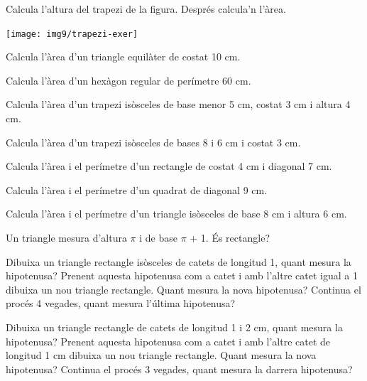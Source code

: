 \begin{activitats}
\begin{mylist}
\exer \hot Calcula l'altura del trapezi de la figura. Després calcula'n l'àrea.

\begin{center}
	\texttt{[image: img9/trapezi-exer]}
\end{center}

\exer  Calcula l'àrea d'un triangle equilàter de costat 10 cm.

\exer  Calcula l'àrea d'un hexàgon regular de perímetre 60 cm.

\exer  Calcula l'àrea d'un trapezi isòsceles de base menor 5 cm, costat 3 cm i altura 4 cm.

\exer  Calcula l'àrea d'un trapezi isòsceles de bases 8 i 6 cm i costat 3 cm.

\exer  Calcula l'àrea i el perímetre d'un rectangle de costat 4 cm i diagonal 7 cm.

\exer  Calcula l'àrea i el perímetre d'un quadrat de diagonal 9 cm.

\exer  Calcula l'àrea i el perímetre d'un triangle isòsceles de base 8 cm i altura 6 cm.

\exer  Un triangle mesura d'altura $\pi$ i de base $\pi$ + 1. És rectangle?

\exer  Dibuixa un triangle rectangle isòsceles de catets de longitud 1, quant mesura la hipotenusa? Prenent aquesta hipotenusa com a catet i amb l'altre catet igual a 1 dibuixa un nou triangle rectangle. Quant mesura la nova hipotenusa? Continua el procés 4 vegades, quant mesura l'última hipotenusa?

\exer  Dibuixa un triangle rectangle de catets de longitud 1 i 2 cm, quant mesura la hipotenusa? Prenent aquesta hipotenusa com a catet i amb l'altre catet de longitud 1 cm dibuixa un nou triangle rectangle. Quant mesura la nova hipotenusa? Continua el procés 3 vegades, quant mesura la darrera hipotenusa?


\end{mylist}
\end{activitats}
